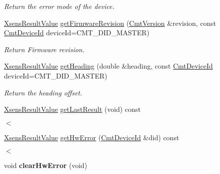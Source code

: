 \begin{DoxyCompactItemize}
\begin{DoxyCompactList}\small\item\em \-Return the error mode of the device. \end{DoxyCompactList}\item 
\hyperlink{group__enums_ga822a2260a20af524029eef9e9a51ff6f}{\-Xsens\-Result\-Value} \hyperlink{classxsens_1_1Cmt3_a9ab69932efd63b35cadb387cb7257ad4}{get\-Firmware\-Revision} (\hyperlink{structCmtVersion}{\-Cmt\-Version} \&revision, const \hyperlink{cmtdef_8h_a2e3b6a17360828d440ee848959918af2}{\-Cmt\-Device\-Id} device\-Id=\-C\-M\-T\-\_\-\-D\-I\-D\-\_\-\-M\-A\-S\-T\-E\-R)
\begin{DoxyCompactList}\small\item\em \-Return \-Firmware revision. \end{DoxyCompactList}\item 
\hyperlink{group__enums_ga822a2260a20af524029eef9e9a51ff6f}{\-Xsens\-Result\-Value} \hyperlink{classxsens_1_1Cmt3_a75d225fde24a1ad5e6b24d4c7ad99e55}{get\-Heading} (double \&heading, const \hyperlink{cmtdef_8h_a2e3b6a17360828d440ee848959918af2}{\-Cmt\-Device\-Id} device\-Id=\-C\-M\-T\-\_\-\-D\-I\-D\-\_\-\-M\-A\-S\-T\-E\-R)
\begin{DoxyCompactList}\small\item\em \-Return the heading offset. \end{DoxyCompactList}\item 
\hyperlink{group__enums_ga822a2260a20af524029eef9e9a51ff6f}{\-Xsens\-Result\-Value} \hyperlink{classxsens_1_1Cmt3_a1eaa8a25a18651d28ccd5451fa32122d}{get\-Last\-Result} (void) const 
\begin{DoxyCompactList}\small\item\em $<$ \end{DoxyCompactList}\item 
\hyperlink{group__enums_ga822a2260a20af524029eef9e9a51ff6f}{\-Xsens\-Result\-Value} \hyperlink{classxsens_1_1Cmt3_a2ae9b60afbcc52ce2242767743b862d0}{get\-Hw\-Error} (\hyperlink{cmtdef_8h_a2e3b6a17360828d440ee848959918af2}{\-Cmt\-Device\-Id} \&did) const 
\begin{DoxyCompactList}\small\item\em $<$ \end{DoxyCompactList}\item 
\hypertarget{classxsens_1_1Cmt3_a492cc36f644497d92bdb3856ef7126e3}{void {\bfseries clear\-Hw\-Error} (void)}\label{classxsens_1_1Cmt3_a492cc36f644497d92bdb3856ef7126e3}


\end{DoxyCompactItemize}
